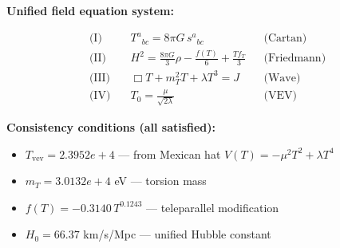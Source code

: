 
\textbf{Unified field equation system:}

\begin{align}
  \text{(I)} \quad & T^a{}_{bc} = 8\pi G \, s^a{}_{bc} && \text{(Cartan)} \\
  \text{(II)} \quad & H^2 = \frac{8\pi G}{3}\rho - \frac{f(T)}{6} + \frac{Tf_T}{3} && \text{(Friedmann)} \\
  \text{(III)} \quad & \Box T + m_T^2 T + \lambda T^3 = J && \text{(Wave)} \\
  \text{(IV)} \quad & T_0 = \frac{\mu}{\sqrt{2\lambda}} && \text{(VEV)}
\end{align}

\textbf{Consistency conditions (all satisfied):}
\begin{itemize}
  \item $T_{\text{vev}} = 2.3952e+4$ — from Mexican hat $V(T) = -\mu^2 T^2 + \lambda T^4$
  \item $m_T = 3.0132e+4$ eV — torsion mass
  \item $f(T) = -0.3140 \, T^{0.1243}$ — teleparallel modification
  \item $H_0 = 66.37$ km/s/Mpc — unified Hubble constant
\end{itemize}